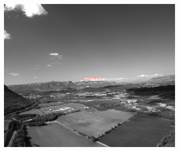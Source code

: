 \begin{figure}[btp]
  \centering
  \begin{subfigure}{\textwidth}
    \centering
    \includegraphics[width = .45\linewidth]{figures/best-1.png}
  \end{subfigure}
  \vspace{1ex}


\end{figure}
